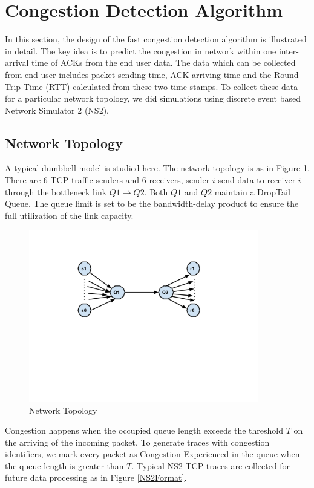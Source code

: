 \section{Congestion Detection Algorithm}
\label{Design}
In this section, the design of the fast congestion detection algorithm is illustrated in detail. The key idea is to predict the congestion in network within one inter-arrival time of ACKs from the end user data. The data which can be collected from end user includes packet sending time, ACK arriving time and the Round-Trip-Time (RTT) calculated from these two time stamps. To collect these data for a particular network topology, we did simulations using discrete event based Network Simulator 2 (NS2). 
\subsection{Network Topology}
A typical dumbbell model is studied here. The network topology is as in Figure \ref{layout}. There are $6$ TCP traffic senders and $6$ receivers, sender $i$ send data to receiver $i$ through the bottleneck link $Q1\to Q2$. Both $Q1$ and $Q2$ maintain a DropTail Queue. The queue limit is set to be the bandwidth-delay product to ensure the full utilization of the link capacity.

\begin{figure}
\centering
\includegraphics[width=10cm]{6layout.pdf}
\caption{Network Topology}
\label{layout}
\end{figure}
Congestion happens when the occupied queue length exceeds the threshold $T$ on the arriving of the incoming packet. To generate traces with congestion identifiers, we mark every packet as Congestion Experienced in the queue when the queue length is greater than $T$. Typical NS2 TCP traces  \cite{TraceFormat} are collected for future data processing as in Figure \ref{NS2Format}. 

